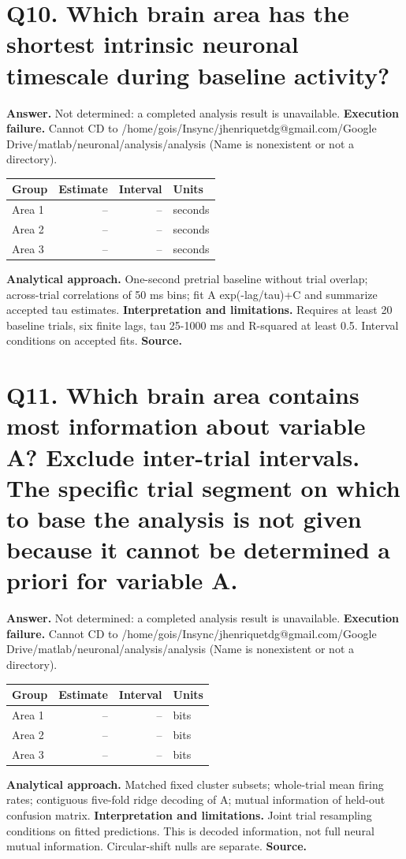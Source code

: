 \documentclass[11pt,a4paper]{article}
\begin{document}
\section*{Q10. Which brain area has the shortest intrinsic neuronal timescale during baseline activity?}
\textbf{Answer.} Not determined: a completed analysis result is unavailable.
\textbf{Execution failure.} Cannot CD to /home/gois/Insync/jhenriquetdg@gmail.com/Google Drive/matlab/neuronal/analysis/analysis (Name is nonexistent or not a directory).
\begin{tabularx}{\linewidth}{XrrX}\toprule Group & Estimate & Interval & Units \\\midrule
Area 1 & -- & -- & seconds \\
Area 2 & -- & -- & seconds \\
Area 3 & -- & -- & seconds \\
\bottomrule\end{tabularx}
\textbf{Analytical approach.} One-second pretrial baseline without trial overlap; across-trial correlations of 50 ms bins; fit A exp(-lag/tau)+C and summarize accepted tau estimates.
\textbf{Interpretation and limitations.} Requires at least 20 baseline trials, six finite lags, tau 25-1000 ms and R-squared at least 0.5. Interval conditions on accepted fits.
\textbf{Source.} 
\clearpage
\section*{Q11. Which brain area contains most information about variable A? Exclude inter-trial intervals. The specific trial segment on which to base the analysis is not given because it cannot be determined a priori for variable A.}
\textbf{Answer.} Not determined: a completed analysis result is unavailable.
\textbf{Execution failure.} Cannot CD to /home/gois/Insync/jhenriquetdg@gmail.com/Google Drive/matlab/neuronal/analysis/analysis (Name is nonexistent or not a directory).
\begin{tabularx}{\linewidth}{XrrX}\toprule Group & Estimate & Interval & Units \\\midrule
Area 1 & -- & -- & bits \\
Area 2 & -- & -- & bits \\
Area 3 & -- & -- & bits \\
\bottomrule\end{tabularx}
\textbf{Analytical approach.} Matched fixed cluster subsets; whole-trial mean firing rates; contiguous five-fold ridge decoding of A; mutual information of held-out confusion matrix.
\textbf{Interpretation and limitations.} Joint trial resampling conditions on fitted predictions. This is decoded information, not full neural mutual information. Circular-shift nulls are separate.
\textbf{Source.} 
\clearpage
\end{document}
